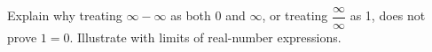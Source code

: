 Explain why treating $\infty-\infty$ as both 0 and $\infty$, or treating $\dfrac{\infty}{\infty}$ as 1, does not prove $1=0$. Illustrate with limits of real-number expressions.
